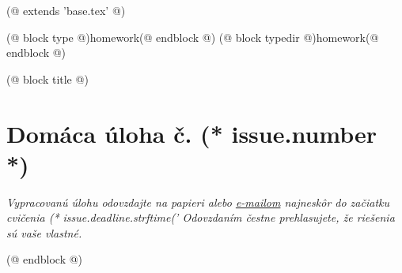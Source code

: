 (@ extends 'base.tex' @)

(@ block type @)homework(@ endblock @)
(@ block typedir @)homework(@ endblock @)

(@ block title @)
    \section{Domáca úloha č. (* issue.number *)}
    \begin{center}
        \textit{%
            Vypracovanú úlohu odovzdajte na papieri alebo \href{mailto:(* year.teacher.email *)}{e-mailom}
            najneskôr do začiatku cvičenia (* issue.deadline.strftime('%
            Odovzdaním čestne prehlasujete, že riešenia sú vaše vlastné.}
    \end{center}
(@ endblock @)
